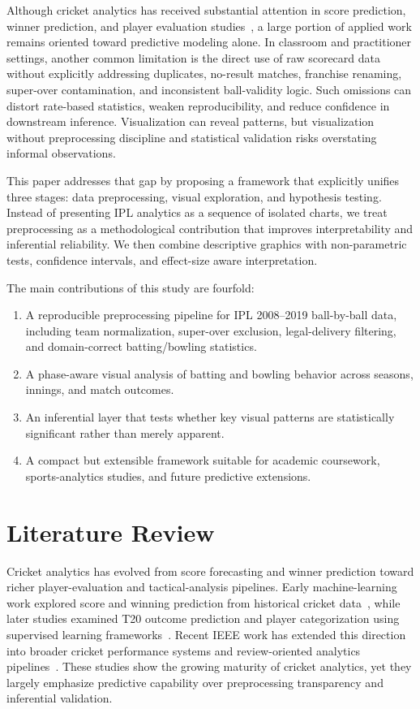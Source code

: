\documentclass[conference]{IEEEtran}
\begin{document}
Although cricket analytics has received substantial attention in score prediction, winner prediction, and player evaluation studies~\cite{ref1,ref2,ref3,ref4,ref5,ref14,ref15,ref16}, a large portion of applied work remains oriented toward predictive modeling alone. In classroom and practitioner settings, another common limitation is the direct use of raw scorecard data without explicitly addressing duplicates, no-result matches, franchise renaming, super-over contamination, and inconsistent ball-validity logic. Such omissions can distort rate-based statistics, weaken reproducibility, and reduce confidence in downstream inference. Visualization can reveal patterns, but visualization without preprocessing discipline and statistical validation risks overstating informal observations.

This paper addresses that gap by proposing a framework that explicitly unifies three stages: data preprocessing, visual exploration, and hypothesis testing. Instead of presenting IPL analytics as a sequence of isolated charts, we treat preprocessing as a methodological contribution that improves interpretability and inferential reliability. We then combine descriptive graphics with non-parametric tests, confidence intervals, and effect-size aware interpretation.

The main contributions of this study are fourfold:
\begin{enumerate}
    \item A reproducible preprocessing pipeline for IPL 2008--2019 ball-by-ball data, including team normalization, super-over exclusion, legal-delivery filtering, and domain-correct batting/bowling statistics.
    \item A phase-aware visual analysis of batting and bowling behavior across seasons, innings, and match outcomes.
    \item An inferential layer that tests whether key visual patterns are statistically significant rather than merely apparent.
    \item A compact but extensible framework suitable for academic coursework, sports-analytics studies, and future predictive extensions.
\end{enumerate}

\section{Literature Review}
Cricket analytics has evolved from score forecasting and winner prediction toward richer player-evaluation and tactical-analysis pipelines. Early machine-learning work explored score and winning prediction from historical cricket data~\cite{ref1}, while later studies examined T20 outcome prediction and player categorization using supervised learning frameworks~\cite{ref2,ref3,ref4}. Recent IEEE work has extended this direction into broader cricket performance systems and review-oriented analytics pipelines~\cite{ref5,ref6,ref7}. These studies show the growing maturity of cricket analytics, yet they largely emphasize predictive capability over preprocessing transparency and inferential validation.
\end{document}
